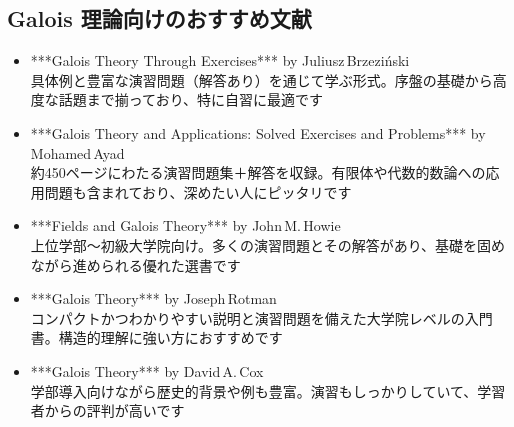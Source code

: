 \documentclass[11pt]{article}
\begin{document}
\subsection*{Galois 理論向けのおすすめ文献}
\begin{itemize}
\item ***Galois Theory Through Exercises*** by Juliusz Brzeziński\\
  具体例と豊富な演習問題（解答あり）を通じて学ぶ形式。序盤の基礎から高度な話題まで揃っており、特に自習に最適です
\item ***Galois Theory and Applications: Solved Exercises and Problems*** by Mohamed Ayad\\
  約450ページにわたる演習問題集＋解答を収録。有限体や代数的数論への応用問題も含まれており、深めたい人にピッタリです
\item ***Fields and Galois Theory*** by John M. Howie\\
  上位学部〜初級大学院向け。多くの演習問題とその解答があり、基礎を固めながら進められる優れた選書です 
\item ***Galois Theory*** by Joseph Rotman\\
  コンパクトかつわかりやすい説明と演習問題を備えた大学院レベルの入門書。構造的理解に強い方におすすめです
\item ***Galois Theory*** by David A. Cox\\
  学部導入向けながら歴史的背景や例も豊富。演習もしっかりしていて、学習者からの評判が高いです
\end{itemize}
\end{document}
